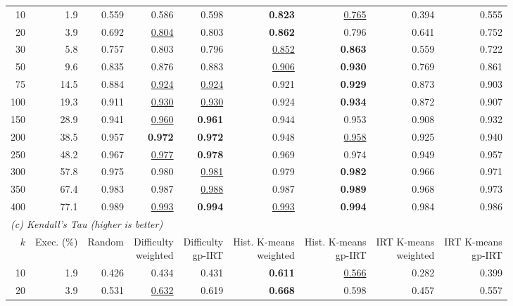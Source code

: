 \begin{table}[t]
\begin{tabular}{rrrrrrrrr}
    \midrule
    10 & 1.9 & 0.559 & 0.586 & 0.598 & \textbf{0.823} & \underline{0.765} & 0.394 & 0.555 \\
    20 & 3.9 & 0.692 & \underline{0.804} & 0.803 & \textbf{0.862} & 0.796 & 0.641 & 0.752 \\
    30 & 5.8 & 0.757 & 0.803 & 0.796 & \underline{0.852} & \textbf{0.863} & 0.559 & 0.722 \\
    50 & 9.6 & 0.835 & 0.876 & 0.883 & \underline{0.906} & \textbf{0.930} & 0.769 & 0.861 \\
    75 & 14.5 & 0.884 & \underline{0.924} & \underline{0.924} & 0.921 & \textbf{0.929} & 0.873 & 0.903 \\
    100 & 19.3 & 0.911 & \underline{0.930} & \underline{0.930} & 0.924 & \textbf{0.934} & 0.872 & 0.907 \\
    150 & 28.9 & 0.941 & \underline{0.960} & \textbf{0.961} & 0.944 & 0.953 & 0.908 & 0.932 \\
    200 & 38.5 & 0.957 & \textbf{0.972} & \textbf{0.972} & 0.948 & \underline{0.958} & 0.925 & 0.940 \\
    250 & 48.2 & 0.967 & \underline{0.977} & \textbf{0.978} & 0.969 & 0.974 & 0.949 & 0.957 \\
    300 & 57.8 & 0.975 & 0.980 & \underline{0.981} & 0.979 & \textbf{0.982} & 0.966 & 0.971 \\
    350 & 67.4 & 0.983 & 0.987 & \underline{0.988} & 0.987 & \textbf{0.989} & 0.968 & 0.973 \\
    400 & 77.1 & 0.989 & \underline{0.993} & \textbf{0.994} & \underline{0.993} & \textbf{0.994} & 0.984 & 0.986 \\
    \midrule
    \multicolumn{9}{l}{\textit{(c) Kendall's Tau (higher is better)}} \\
    $k$ & Exec. (\%) & Random & \shortstack{Difficulty\\weighted} & \shortstack{Difficulty\\gp-IRT} & \shortstack{Hist. K-means\\weighted} & \shortstack{Hist. K-means\\gp-IRT} & \shortstack{IRT K-means\\weighted} & \shortstack{IRT K-means\\gp-IRT} \\
    \midrule
    10 & 1.9 & 0.426 & 0.434 & 0.431 & \textbf{0.611} & \underline{0.566} & 0.282 & 0.399 \\
    20 & 3.9 & 0.531 & \underline{0.632} & 0.619 & \textbf{0.668} & 0.598 & 0.457 & 0.557 \\

\end{tabular}
\end{table}
